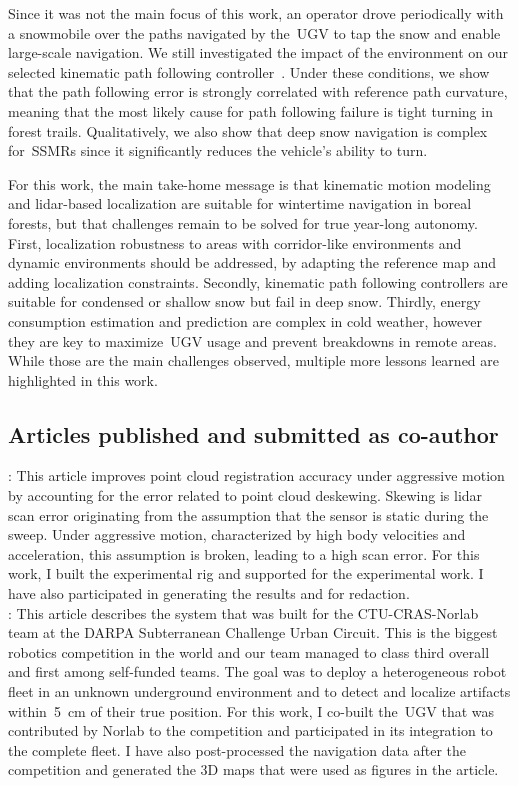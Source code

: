 \documentclass[12pt,letterpaper,oneside]{article}
\begin{document}
Since it was not the main focus of this work, an operator drove periodically with a snowmobile over the paths navigated by the~\ac{UGV} to tap the snow and enable large-scale navigation.
We still investigated the impact of the environment on our selected kinematic path following controller~\citep{Huskic2017}.
Under these conditions, we show that the path following error is strongly correlated with reference path curvature, meaning that the most likely cause for path following failure is tight turning in forest trails.
Qualitatively, we also show that deep snow navigation is complex for~\acp{SSMR} since it significantly reduces the vehicle's ability to turn.

For this work, the main take-home message is that kinematic motion modeling and lidar-based localization are suitable for wintertime navigation in boreal forests, but that challenges remain to be solved for true year-long autonomy.
First, localization robustness to areas with corridor-like environments and dynamic environments should be addressed, by adapting the reference map and adding localization constraints.
Secondly, kinematic path following controllers are suitable for condensed or shallow snow but fail in deep snow.
Thirdly, energy consumption estimation and prediction are complex in cold weather, however they are key to maximize~\ac{UGV} usage and prevent breakdowns in remote areas.
While those are the main challenges observed, multiple more lessons learned are highlighted in this work.

\subsection{Articles published and submitted as co-author}

\textbf{}: 
This article improves point cloud registration accuracy under aggressive motion by accounting for the error related to point cloud deskewing.
Skewing is lidar scan error originating from the assumption that the sensor is static during the sweep.
Under aggressive motion, characterized by high body velocities and acceleration, this assumption is broken, leading to a high scan error.
For this work, I built the experimental rig and supported for the experimental work.
I have also participated in generating the results and for redaction.
\\

\textbf{}:
This article describes the system that was built for the CTU-CRAS-Norlab team at the DARPA Subterranean Challenge Urban Circuit.
This is the biggest robotics competition in the world and our team managed to class third overall and first among self-funded teams.
The goal was to deploy a heterogeneous robot fleet in an unknown underground environment and to detect and localize artifacts within~\SI{5}{\centi\meter} of their true position.
For this work, I co-built the~\ac{UGV} that was contributed by Norlab to the competition and participated in its integration to the complete fleet.
I have also post-processed the navigation data after the competition and generated the 3D maps that were used as figures in the article.
\\
\end{document}

